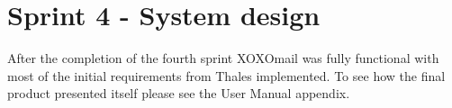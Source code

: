 \section{Sprint 4 - System design}


After the completion of the fourth sprint XOXOmail was fully functional with most of the initial requirements from Thales implemented. To see how the final product presented itself please see the User Manual appendix.